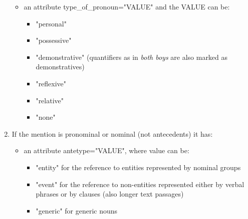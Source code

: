 \documentclass[a4paper]{article}
\begin{document}
\begin{enumerate}
\begin{itemize}
%  
 
 \item an attribute type\_of\_pronoun="VALUE" and the VALUE can be:
 \begin{itemize}
 \item "personal"
 \item "possessive"
 \item "demonstrative" (quantifiers as in \textsl{both boys} are also marked as demonstratives)
 \item "reflexive"
 \item "relative"
 \item "none"
 \end{itemize}

\end{itemize}

\item If the mention is pronominal or nominal (not antecedents) it has:
\begin{itemize}
\item an attribute antetype="VALUE", where value can be:
\begin{itemize}
\item "entity" for the reference to entities represented by nominal groups
\item "event" for the reference to non-entities represented either by verbal phrases or by clauses (also longer text passages)
\item "generic" for generic nouns
\end{itemize}
 

\end{itemize}
\end{enumerate}
\end{document}
